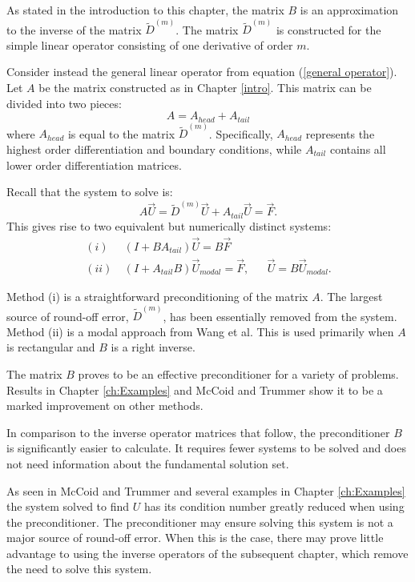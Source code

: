 \documentclass{sfuthesis}
\begin{document}
As stated in the introduction to this chapter, the matrix $B$ is an approximation to the inverse of the matrix $\tilde{D}^{(m)}$.
The matrix $\tilde{D}^{(m)}$ is constructed for the simple linear operator consisting of one derivative of order $m$.

Consider instead the general linear operator from equation (\ref{general operator}).
Let $A$ be the matrix constructed as in Chapter \ref{intro}.
This matrix can be divided into two pieces:
\begin{equation}
A = A_{head} + A_{tail}
\end{equation}
where $A_{head}$ is equal to the matrix $\tilde{D}^{(m)}$.
Specifically, $A_{head}$ represents the highest order differentiation and boundary conditions, while $A_{tail}$ contains all lower order differentiation matrices.

Recall that the system to solve is:
\begin{equation}
A \vec{U} = \tilde{D}^{(m)} \vec{U} + A_{tail} \vec{U} = \vec{F}.
\end{equation}
This gives rise to two equivalent but numerically distinct systems:
\begin{equation}
\begin{aligned}
(i) & \ (I + B A_{tail}) \vec{U} = B \vec{F} \\
(ii) & \ (I + A_{tail} B) \vec{U}_{modal} = \vec{F}, && \vec{U} = B \vec{U}_{modal} .
\end{aligned}
\end{equation}

Method (i) is a straightforward preconditioning of the matrix $A$.
The largest source of round-off error, $\tilde{D}^{(m)}$, has been essentially removed from the system.
Method (ii) is a modal approach from Wang et al. \cite{wang2014well}
This is used primarily when $A$ is rectangular and $B$ is a right inverse.

The matrix $B$ proves to be an effective preconditioner for a variety of problems.
Results in Chapter \ref{ch:Examples} and McCoid and Trummer \cite{McCoid2017} show it to be a marked improvement on other methods.

In comparison to the inverse operator matrices that follow, the preconditioner $B$ is significantly easier to calculate.
It requires fewer systems to be solved and does not need information about the fundamental solution set.

As seen in McCoid and Trummer \cite{McCoid2017} and several examples in Chapter \ref{ch:Examples} the system solved to find $U$ has its condition number greatly reduced when using the preconditioner.
The preconditioner may ensure solving this system is not a major source of round-off error.
When this is the case, there may prove little advantage to using the inverse operators of the subsequent chapter, which remove the need to solve this system.
\end{document}
